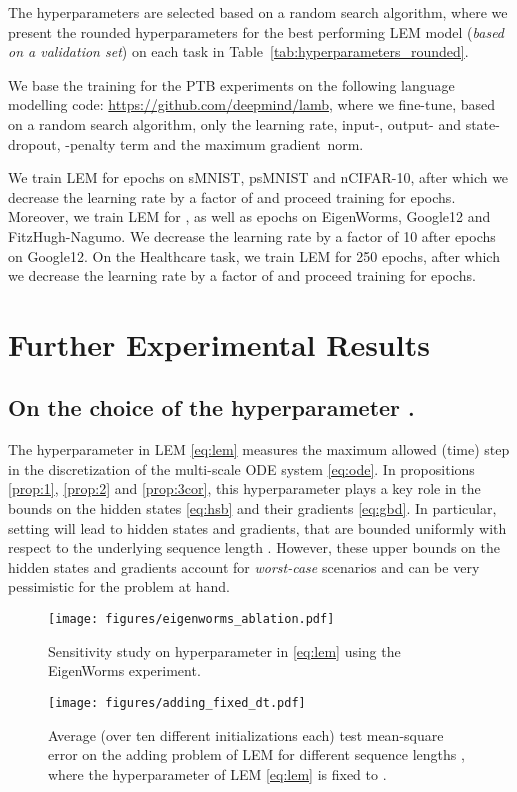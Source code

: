 \documentclass{article} \usepackage{iclr2022_conference,times}
\newcommand{\Tref}[1]{Table~\ref{#1}}
\begin{document}
The hyperparameters are selected based on a random search algorithm, where we present the rounded hyperparameters for the best performing LEM model (\emph{based on a validation set}) on each task in \Tref{tab:hyperparameters_rounded}.

We base the training for the PTB experiments on the following language modelling code: \href{https://github.com/deepmind/lamb}{https://github.com/deepmind/lamb}, where we fine-tune, based on a random search algorithm, only the learning rate, input-, output- and state-dropout, -penalty term and the maximum gradient~norm.

We train LEM for  epochs on sMNIST, psMNIST and nCIFAR-10, after which we decrease the learning rate by a factor of  and proceed training for  epochs. Moreover, we train LEM for ,  as well as  epochs on EigenWorms, Google12 and FitzHugh-Nagumo. We decrease the learning rate by a factor of 10 after  epochs on Google12. On the Healthcare task, we train LEM for 250 epochs, after which we decrease the learning rate by a factor of  and proceed training for  epochs.
\section{Further Experimental Results}
\label{app:fer}
\subsection{On the choice of the hyperparameter .}
\label{app:dt}
The hyperparameter  in LEM \eqref{eq:lem} measures the maximum allowed (time) step in the discretization of the multi-scale ODE system \eqref{eq:ode}. In propositions \ref{prop:1}, \ref{prop:2} and \ref{prop:3cor}, this hyperparameter  plays a key role in the bounds on the hidden states \eqref{eq:hsb} and their gradients \eqref{eq:gbd}. In particular, setting  will lead to hidden states and gradients, that are bounded uniformly with respect to the underlying sequence length . However, these upper bounds on the hidden states and gradients account for \emph{worst-case} scenarios and can be very pessimistic for the problem at hand.

\begin{figure}[ht!]
\centering
\begin{minipage}[t]{.48\textwidth}
\texttt{[image: figures/eigenworms\_ablation.pdf]}
\caption{Sensitivity study on hyperparameter  in \eqref{eq:lem} using the EigenWorms experiment.}
\label{fig:eworms_abl}
\end{minipage}
\hspace{0.0025\textwidth}
\begin{minipage}[t]{.48\textwidth}
\texttt{[image: figures/adding\_fixed\_dt.pdf]}
\caption{Average (over ten different initializations each) test mean-square error on the adding problem of LEM for different sequence lengths , where the hyperparameter  of LEM \eqref{eq:lem} is fixed to .}
\label{fig:adding_fixed_dt}
\end{minipage}
\end{figure}
\end{document}
